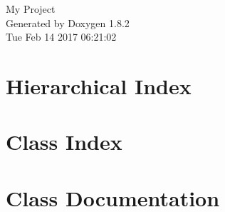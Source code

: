 \documentclass{book}
\begin{document}
\hypersetup{pageanchor=false,citecolor=blue}
\begin{titlepage}
\vspace*{7cm}
\begin{center}
{\Large My Project }\\
\vspace*{1cm}
{\large Generated by Doxygen 1.8.2}\\
\vspace*{0.5cm}
{\small Tue Feb 14 2017 06:21:02}\\
\end{center}
\end{titlepage}
\clearemptydoublepage
{}
\tableofcontents
\clearemptydoublepage
{}
\hypersetup{pageanchor=true,citecolor=blue}
\chapter{Hierarchical Index}

\chapter{Class Index}

\chapter{Class Documentation}



























\printindex
\end{document}
